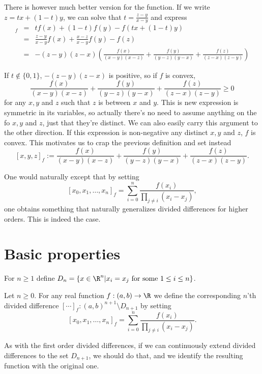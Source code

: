 There is however much better version for the function. If we write $z = t x + (1 - t) y$, we can solve that $t = \frac{z - y}{x - y}$ and express
\begin{eqnarray*}
	[x, y, t]_{f} &=& t f(x) + (1 - t) f(y) - f(t x + (1 - t)y) \\
	&=& \frac{z - y}{x - y} f(x) + \frac{x - z}{x - y} f(y) - f(z) \\
	&=& -(z - y)(z - x) \left(\frac{f(x)}{(x - y)(x - z)} + \frac{f(y)}{(y - z)(y - x)} + \frac{f(z)}{(z - x)(z - y)} \right)
\end{eqnarray*}

If $t \notin \{0, 1\}$, $-(z - y)(z - x)$ is positive, so if $f$ is convex,
\[
	\frac{f(x)}{(x - y)(x - z)} + \frac{f(y)}{(y - z)(y - x)} + \frac{f(z)}{(z - x)(z - y)} \geq 0
\]
for any $x, y$ and $z$ such that $z$ is between $x$ and $y$. This is new expression is symmetric in its variables, so actually there's no need to assume anything on the fo $x, y$ and $z$, just that they're distinct. We can also easily carry this argument to the other direction. If this expression is non-negative any distinct $x, y$ and $z$, $f$ is convex. This motivates us to crap the previous definition and set instead
\[
	[x, y, z]_{f} := \frac{f(x)}{(x - y)(x - z)} + \frac{f(y)}{(y - z)(y - x)} + \frac{f(z)}{(z - x)(z - y)}.
\]

One would naturally except that by setting
\[ 
	[x_{0}, x_{1}, \ldots, x_{n}]_{f} = \sum_{i = 0}^{n} \frac{f(x_{i})}{\prod_{j \neq i} (x_{i} - x_{j})},
\]
one obtains something that naturally generalizes divided differences for higher orders. This is indeed the case.

\section{Basic properties}

For $n \geq 1$ define $D_{n} = \{x\in \R^{n} | x_{i} = x_{j} \text{ for some $1 \leq i \leq n$}\}$.
\begin{maar}
Let $n \geq 0$. For any real function $f : (a, b) \to \R$ we define the corresponding $n$'th divided difference $[\cdots]_{f} : (a, b)^{n + 1} \setminus D_{n + 1}$ by setting
\[
	[x_{0}, x_{1}, \ldots, x_{n}]_{f} = \sum_{i = 0}^{n} \frac{f(x_{i})}{\prod_{j \neq i} (x_{i} - x_{j})}.
\]
\end{maar}

As with the first order divided differences, if we can continuously extend divided differences to the set $D_{n + 1}$, we should do that, and we identify the resulting function with the original one.

